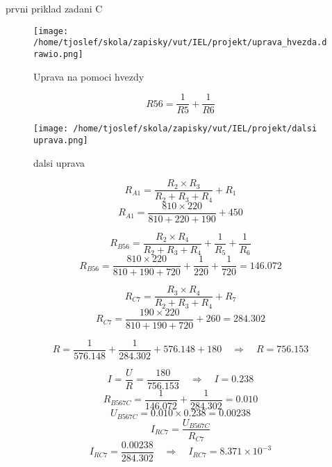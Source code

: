 \documentclass{article}
\begin{document}
\sloppy
prvni priklad zadani C

\begin{figure}[h!]
  \centering
  \texttt{[image: /home/tjoslef/skola/zapisky/vut/IEL/projekt/uprava\_hvezda.drawio.png]}
  \caption{Uprava na pomoci hvezdy}
  \label{fig:hvezda}
\end{figure}

\[
    R56 = \frac{1}{R5} + \frac{1}{R6}
\]

\begin{figure}[h!]
  \centering
\texttt{[image: /home/tjoslef/skola/zapisky/vut/IEL/projekt/dalsi uprava.png]}
  \caption{dalsi uprava}
  \label{fig:dalsi_uprava}
\end{figure}

\[
R_{A1} = \frac{R_2 \times R_3}{R_2 + R_3 + R_4} + R_1
\]
\[
R_{A1} = \frac{810 \times 220}{810 + 220 + 190} + 450
\]

\[
R_{B56} = \frac{R_2 \times R_4}{R_2 + R_3 + R_4} + \frac{1}{R_5} + \frac{1}{R_6}
\]
\[
R_{B56} = \frac{810 \times 220}{810 + 190 + 720} + \frac{1}{220} + \frac{1}{720} = 146.072
\]

\[
R_{C7} = \frac{R_3 \times R_4}{R_2 + R_3 + R_4} + R_7
\]
\[
R_{C7} = \frac{190 \times 220}{810 + 190 + 720} + 260 = 284.302
\]

\[
R = \frac{1}{576.148} + \frac{1}{284.302} + 576.148 + 180 \quad \Rightarrow \quad R = 756.153
\]

\[
I = \frac{U}{R} = \frac{180}{756.153} \quad \Rightarrow \quad I = 0.238
\]
\[
R_{B567C} = \frac{1}{146.072} + \frac{1}{284.302} = 0.010
\]
\[
U_{B567C} = 0.010 \times 0.238 = 0.00238
\]
\[
I_{RC7} = \frac{U_{B567C}}{R_{C7}}
\]
\[
    I_{RC7} = \frac{0.00238}{284.302}
    \quad \Rightarrow \quad I_{RC7} = 8.371 \times 10^{-3}
\]
\end{document}
